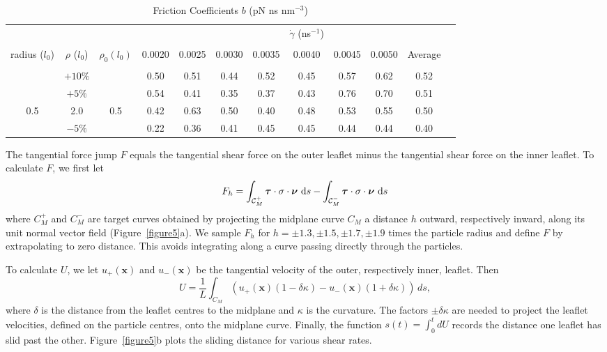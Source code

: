 \documentclass[lineno]{jfm}
\newcommand{\nnu}{\boldsymbol{\nu}}
\newcommand{\ttau}{\boldsymbol{\tau}}
\begin{document}
\begin{table}
\caption{Friction Coefficients $b$ (pN ns nm$^{-3}$) \\
}
\centering
\begin{tabular}{c c c c c c c c c c c c }
& & & & & & & $\dot\gamma$  (ns$^{-1}$) & & & &\\
\cline{1-11}\\
  radius ($l_0$) &  $\rho$ ($l_0$) & $\rho_0(l_0)$ & 0.0020   &  0.0025 &  0.0030 &  0.0035 &  0.0040 & 0.0045 & 0.0050  & Average\\
\cline{4-10}\\
& $+ 10 \%$ &     & 0.50  & 0.51  &  0.44 & 0.52  & 0.45 &  0.57   &  0.62 & 0.52  \\ 
& $+ 5 \%$ & & 0.54 & 0.41 & 0.35  & 0.37 & 0.43 & 0.76  & 0.70 & 0.51\\ 
0.5 &  2.0 & 0.5    & 0.42 & 0.63 & 0.50   & 0.40  & 0.48  & 0.53 & 0.55 & 0.50 \\   %
& $- 5 \%$ &  & 0.22 & 0.36 & 0.41   & 0.45  & 0.45 & 0.44   & 0.44 & 0.40\\ 
\end{tabular} 
\label{table1}
\end{table}


The tangential force jump $F$ equals the 
tangential shear force on the outer
leaflet minus the tangential shear force on the inner leaflet. 
To calculate  $F$, we first let 
\begin{align}
F_h = \int_{\mathcal{C}_M^+} 
  \ttau \cdot \sigma \cdot \nnu \,\dif s - \int_{\mathcal{C}_M^-} 
 \ttau \cdot \sigma \cdot \nnu \,\dif s 
\end{align}
where $C_M^+$ and $C_M^-$ are target curves obtained by projecting the
midplane curve $C_M$  a distance $h$ outward,
respectively inward, along its unit normal vector field (Figure~\ref{figure5}a). We sample $F_h$ for 
$h = \pm 1.3, \pm 1.5,  \pm 1.7, \pm 1.9$ times the particle radius and define $F$ by
extrapolating to zero distance. This avoids integrating along a curve passing directly through the
particles.   

To calculate $U$, we let $u_+(\mathbf{x})$ and $u_-(\mathbf{x})$ 
be the tangential velocity of the outer, respectively inner, leaflet.  Then 
\begin{equation}
  U = \frac{1}{L}\int_{C_M}\left(u_+(\mathbf{x})(1 - \delta \kappa) -
  u_-(\mathbf{x})(1 +  \delta \kappa)\right) \, ds,
\end{equation}
where $ \delta $ is the distance from the leaflet centres to the midplane and $\kappa$ is the curvature. 
The factors $\pm  \delta \kappa$ are needed to project the leaflet velocities, defined on the particle centres,
onto the midplane curve. 
Finally, the function $s(t) = \int_0^t dU $ records the distance one leaflet has
slid past the other. Figure~\ref{figure5}b plots the sliding distance for various shear
rates. 
\end{document}

